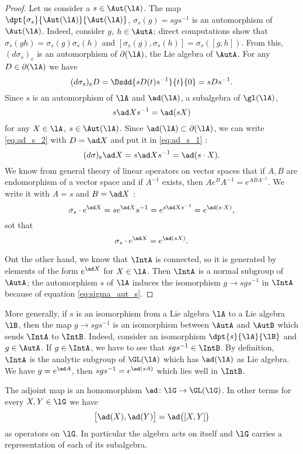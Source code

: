 \begin{proof}
Let us consider a $s\in\Aut(\lA)$. The map $\dpt{\sigma_s}{\Aut(\lA)}{\Aut(\lA)}$, $\sigma_s(g)=sgs^{-1}$ is an automorphism of $\Aut(\lA)$. Indeed, consider $g$, $h\in\AutA$; direct computations show that $\sigma_s(gh)=\sigma_s(g)\sigma_s(h)$ and $[\sigma_s(g),\sigma_s(h)]=\sigma_s([g,h])$. From this, $(d\sigma_s)_e$ is an automorphism of $\partial(\lA)$, the Lie algebra of $\AutA$. For any $D\in\partial(\lA)$ we have
\begin{equation}\label{eq:ad_s_2}
 (d\sigma_s)_eD=\Dsdd{ sD(t)s^{-1} }{t}{0}
             =sDs^{-1}. 
\end{equation}
Since $s$ is an automorphism of $\lA$ and $\ad(\lA)$, a subalgebra of $\gl(\lA)$,
\begin{equation}\label{eq:ad_s_1}
  s\ad Xs^{-1}=\ad(sX)
\end{equation}
for any $X\in\lA$, $s\in\Aut(\lA)$. Since $\ad(\lA)\subset\partial(\lA)$, we can write \eqref{eq:ad_s_2} with $D=\ad X$ and put it in \eqref{eq:ad_s_1} : 
\[
   (d\sigma)_e\ad X=s\ad Xs^{-1}=\ad(s\cdot X).
\]
We know from general theory of linear operators on vector spaces that if $A,B$ are endomorphism of a vector space and if $A^{-1}$ exists, then $Ae^BA^{-1}=e^{ABA^{-1}}$. We write it with $A=s$ and $B=\ad X$ : 
\[
  \sigma_s\cdot e^{\ad X}=se^{\ad X}s^{-1}=e^{s\ad Xs^{-1}}=e^{\ad(s\cdot X)},
\]
sot that 
\begin{equation}\label{eq:sigma_aut_s}
  \sigma_s\cdot e^{\ad X}=e^{\ad(s X)}.
\end{equation}

Ont the other hand, we know that $\IntA$ is connected, so it is generated by elements of the form $e^{\ad X}$ for $X\in\lA$. Then $\IntA$ is a normal subgroup of $\AutA$; the automorphism $s$ of $\lA$ induces the isomorphism $g\to sgs^{-1}$ in $\IntA$ because of equation \eqref{eq:sigma_aut_s}.
\end{proof}

More generally, if $s$ is an isomorphism from a Lie algebra $\lA$ to a Lie algebra $\lB$, then the map $g\to sgs^{-1}$ is an isomorphism between $\AutA$ and $\AutB$ which sends $\IntA$ to $\IntB$. Indeed, consider an isomorphism $\dpt{s}{\lA}{\lB}$ and $g\in\AutA$. If $g\in\IntA$, we have to see that $sgs^{-1}\in\IntB$. By definition, $\IntA$ is the analytic subgroup of $\GL(\lA)$ which has $\ad(\lA)$ as Lie algebra. We have $g=e^{\ad A}$, then $sgs^{-1}=e^{\ad(sA)}$ which lies well in $\IntB$.

\begin{lemma}       \label{LemadhomomadXadYadXY}
    The adjoint map is an homomorphism \( \ad\colon \lG\to \GL(\lG)\). In other terms for every \( X,Y\in\lG\) we have
    \begin{equation}
        \big[ \ad(X),\ad(Y) \big]=\ad\big( [X,Y] \big)
    \end{equation}
    as operators on \( \lG\). In particular the algebra acts on itself and \( \lG\) carries a representation of each of its subalgebra.
\end{lemma}

